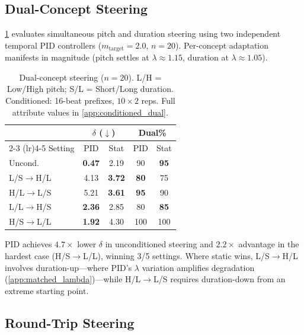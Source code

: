 \documentclass{article}
\theoremstyle{plain}
\begin{document}
\subsection{Dual-Concept Steering}
\label{sec:dual}

\cref{tab:dual} evaluates simultaneous pitch and duration steering using two independent temporal PID controllers ($m_\text{target}{=}2.0$, $n{=}20$). Per-concept adaptation manifests in magnitude (pitch settles at $\lambda{\approx}1.15$, duration at $\lambda{\approx}1.05$).

\begin{table}[t]
  \caption{Dual-concept steering ($n{=}20$). L/H = Low/High pitch; S/L = Short/Long duration. Conditioned: 16-beat prefixes, $10{\times}2$ reps. Full attribute values in \cref{app:conditioned_dual}.}
  \label{tab:dual}
  \begin{center}
  \begin{small}
  \begin{tabular}{lcccc}
    \toprule
    & \multicolumn{2}{c}{$\delta$ ($\downarrow$)} & \multicolumn{2}{c}{Dual\%} \\
    \cmidrule(lr){2-3} \cmidrule(lr){4-5}
    Setting & PID & Stat & PID & Stat \\
    \midrule
    Uncond. & \textbf{0.47} & 2.19 & 90 & \textbf{95} \\
    L/S$\to$H/L & 4.13 & \textbf{3.72} & \textbf{80} & 75 \\
    H/L$\to$L/S & 5.21 & \textbf{3.61} & \textbf{95} & 90 \\
    L/L$\to$H/S & \textbf{2.36} & 2.85 & 80 & \textbf{85} \\
    H/S$\to$L/L & \textbf{1.92} & 4.30 & 100 & 100 \\
    \bottomrule
  \end{tabular}
  \end{small}
  \end{center}
  \vskip -0.1in
\end{table}

PID achieves $4.7{\times}$ lower $\delta$ in unconditioned steering and $2.2{\times}$ advantage in the hardest case (H/S$\to$L/L), winning 3/5 settings. Where static wins, L/S$\to$H/L involves duration-up---where PID's $\lambda$ variation amplifies degradation (\cref{app:matched_lambda})---while H/L$\to$L/S requires duration-down from an extreme starting point.

\subsection{Round-Trip Steering}
\label{sec:roundtrip}
\end{document}
